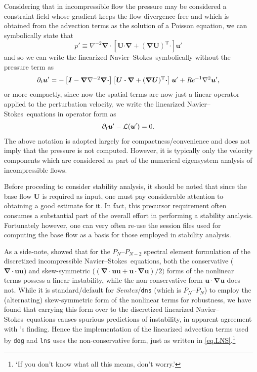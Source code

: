 \documentclass[11pt,a4paper]{report}
\newcommand\Rey{\mbox{\textit{Re}}}
\newcommand\NavSto{Navier--Stokes}
\newcommand\LNS{linearized \NavSto}
\newcommand\Ubase{{\bm{U}}}
\newcommand\upert{{\bm{u}'}}
\newcommand\ppert{{p}'}
\newcommand\Lop{{\cal L}}
\newcommand{\Semtex}{\emph{Semtex}}
\begin{document}
Considering that in incompressible flow the pressure may be considered
a constraint field whose gradient keeps the flow divergence-free and
which is obtained from the advection terms as the solution of a
Poisson equation, we can symbolically state that
\begin{equation}
\ppert\equiv
\nabla^{-2}\bm{\nabla\cdot}\left[\Ubase\bm{\cdot\nabla}
+(\bm{\nabla\Ubase})^\text{T}\bm{\cdot}\right]\upert
\end{equation}
and so we can write the \LNS\ symbolically without the pressure term as
\begin{equation}
\partial_t\upert =
-\left[\bm{I}-\bm{\nabla}\nabla^{-2}\bm{\nabla\cdot}\right]
\left[\Ubase\bm{\cdot\nabla}
  +(\bm{\nabla\Ubase})^\text{T}\bm{\cdot}\right]\upert
+ \Rey^{-1}\nabla^2\upert,
\end{equation}
or more compactly, since now the spatial terms are now just a linear
operator applied to the perturbation velocity, we write the
\LNS\ equations in operator form as
\begin{equation}
\partial_t\upert-\Lop(\upert)=0.		
\label{eq.lns}
\end{equation}
The above notation is adopted largely for compactness/convenience and
does not imply that the pressure is not computed.  However, it is
typically only the velocity components which are considered as part of
the numerical eigensystem analysis of incompressible flows.

Before proceding to consider stability analysis, it should be noted
that since the base flow $\Ubase$ is required as input, one must pay
considerable attention to obtaining a good estimate for it.  In fact,
this precursor requirement often consumes a substantial part of the
overall effort in performing a stability analysis.  Fortunately
however, one can very often re-use the session files used for
computing the base flow as a basis for those employed in stability
analysis.

As a side-note, \citet{wikl01} showed that for the $P_N$--$P_{N-2}$
spectral element formulation of the discretized incompressible
\NavSto\ equations, both the conservative ($\bm{\nabla\cdot uu}$) and
skew-symmetric ($(\bm{\nabla\cdot uu}+\bm{u\cdot\nabla u})/2)$ forms
of the nonlinear terms possess a linear instability, while the
non-conservative form $\bm{u\cdot\nabla u}$ does not.  While it is
standard/default for \Semtex/\verb+dns+ (which is $P_N$--$P_N$) to
employ the (alternating) skew-symmetric form of the nonlinear terms
for robustness, we have found that carrying this form over to the
discretized \LNS\ equations causes spurious predictions of
instability, in apparent agreement with \citeauthor{wikl01}'s
finding. Hence the implementation of the linearized advection terms
used by \verb+dog+ and \verb+lns+ uses the non-conservative form, just
as written in \eqref{eq.LNS}.\footnote{`If you don't know what all
  this means, don't worry.'}
\end{document}
